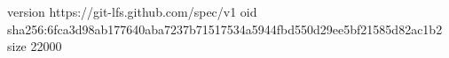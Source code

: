 version https://git-lfs.github.com/spec/v1
oid sha256:6fca3d98ab177640aba7237b71517534a5944fbd550d29ee5bf21585d82ac1b2
size 22000
